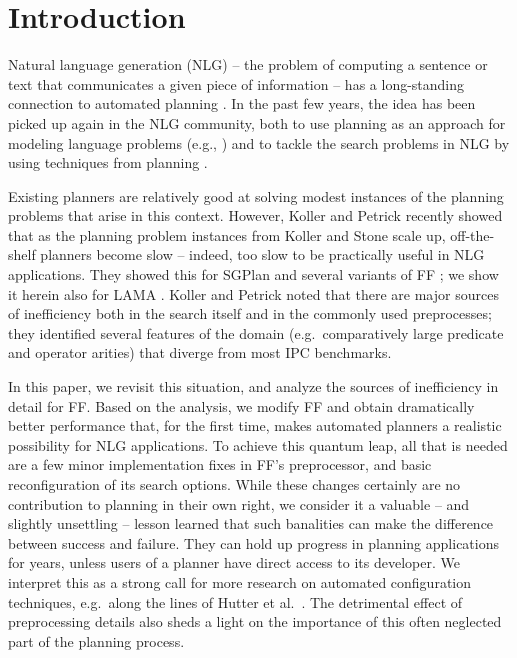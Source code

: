 
\section{Introduction} \label{sec:introduction}

Natural language generation (NLG) -- the problem of computing a
sentence or text that communicates a given piece of information -- has
a long-standing connection to automated planning \cite{perrault80}. In
the past few years, the idea has been picked up again in the NLG
community, both to use planning as an approach for modeling language
problems (e.g., \cite{Steedman-Petrick:07}) and to tackle the search
problems in NLG by using techniques from planning \cite{KolSto07}.

Existing planners are relatively good at solving modest instances of
the planning problems that arise in this context. However, Koller and
Petrick 
recently showed that as the planning problem instances from Koller and
Stone  scale up, off-the-shelf planners become
slow -- indeed, too slow to be practically useful in NLG
applications. They showed this for SGPlan and several variants of FF
\cite{HoffmannNebel01}; we show it herein also for LAMA
\cite{richter:etal:aaai-08}. Koller and Petrick noted that there are
major sources of inefficiency both in the search itself and in the
commonly used preprocesses; they identified several features of the
domain (e.g.\ comparatively large predicate and operator arities) that
diverge from most IPC benchmarks.

In this paper, we revisit this situation, and analyze the sources of
inefficiency in detail for FF. Based on the analysis, we modify FF and
obtain dramatically better performance that, for the first time, makes
automated planners a realistic possibility for NLG applications. To
achieve this quantum leap, all that is needed are a few minor
implementation fixes in FF's preprocessor, and basic reconfiguration
of its search options. While these changes certainly are no
contribution to planning in their own right, we consider it a valuable
-- and slightly unsettling -- lesson learned that such banalities can
make the difference between success and failure. They can hold up
progress in planning applications for years, unless users of a planner
have direct access to its developer. We interpret this as a strong
call for more research on automated configuration techniques,
e.g.\ along the lines of Hutter et al.\ . The
detrimental effect of preprocessing details also sheds a light on the
importance of this often neglected part of the planning process.

